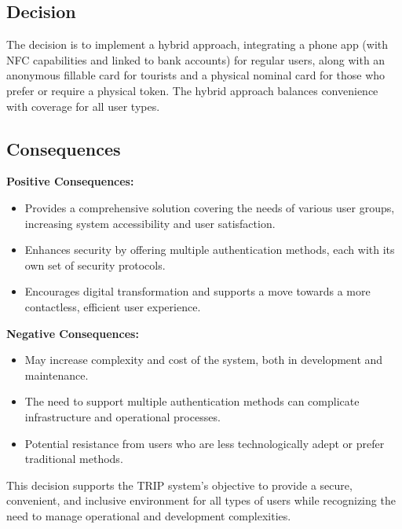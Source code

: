 \subsection*{Decision}
The decision is to implement a hybrid approach, integrating a phone app (with NFC capabilities and linked to bank accounts) for regular users, along with an anonymous fillable card for tourists and a physical nominal card for those who prefer or require a physical token. The hybrid approach balances convenience with coverage for all user types.

\subsection*{Consequences}
\textbf{Positive Consequences:}
\begin{itemize}
    \item Provides a comprehensive solution covering the needs of various user groups, increasing system accessibility and user satisfaction.
    \item Enhances security by offering multiple authentication methods, each with its own set of security protocols.
    \item Encourages digital transformation and supports a move towards a more contactless, efficient user experience.
\end{itemize}
\textbf{Negative Consequences:}
\begin{itemize}
    \item May increase complexity and cost of the system, both in development and maintenance.
    \item The need to support multiple authentication methods can complicate infrastructure and operational processes.
    \item Potential resistance from users who are less technologically adept or prefer traditional methods.
\end{itemize}
This decision supports the TRIP system's objective to provide a secure, convenient, and inclusive environment for all types of users while recognizing the need to manage operational and development complexities.
